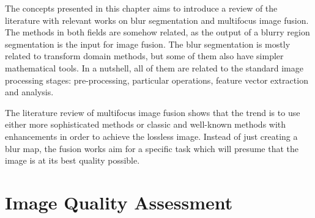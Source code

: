 The concepts presented in this chapter aims to introduce a review of the literature with relevant works on blur segmentation and multifocus image fusion. The methods in both fields are somehow related, as the output of a blurry region segmentation is the input for image fusion. The blur segmentation is mostly related to transform domain methods, but some of them also have simpler mathematical tools. In a nutshell, all of them are related to the standard image processing stages: pre-processing, particular operations, feature vector extraction and analysis. 

The literature review of multifocus image fusion shows that the trend is to use either more sophisticated methods or classic and well-known methods with enhancements in order to achieve the lossless image. Instead of just creating a blur map, the fusion works aim for a specific task which will presume that the image is at its best quality possible. 

\cite{bovik2005handbook}

\section{Image Quality Assessment}

\cite{wang2004image}









